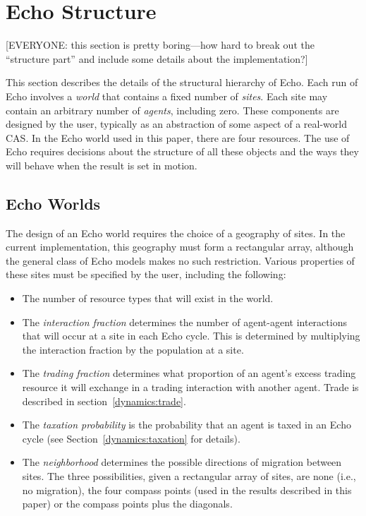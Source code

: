 \section{Echo Structure}
\label{echo-structure}

[EVERYONE: this section is pretty boring---how hard to break out the
``structure part'' and include some details about the implementation?]

This section describes the details of the structural hierarchy of
Echo.  Each run of Echo involves a {\em world\/} that contains a fixed
number of {\em sites}.  Each site may contain an arbitrary number of
{\em agents}, including zero.  These components are designed by the
user, typically as an abstraction of some aspect of a real-world
CAS\@.  In the Echo world used in this paper, there are four
resources.  The use of Echo requires decisions about the structure of
all these objects and the ways they will behave when the result is set
in motion.

\subsection{Echo Worlds}
The design of an Echo world requires the choice of a geography of
sites. In the current implementation, this geography must form a
rectangular array, although the general class of Echo models makes no
such restriction. Various properties of these sites must be
specified by the user, including the following:

\begin{itemize}
\item The number of resource types that will exist in the world.

\item The {\em interaction fraction\/} determines the number of
  agent-agent interactions that will occur at a site in each Echo
  cycle. This is determined by multiplying the interaction fraction by the
  population at a site. 

\item The {\em trading fraction\/} determines what proportion of an
  agent's excess trading resource it will exchange in a trading
  interaction with another agent. Trade is described in
  section~\ref{dynamics:trade}. 

\item The {\em taxation probability\/} is the probability that an
  agent is taxed in an Echo cycle (see Section~\ref{dynamics:taxation}
  for details). 

\item The {\em neighborhood\/} determines the possible directions of
  migration between sites. The three possibilities, given a
  rectangular array of sites, are none (i.e., no migration), the four
  compass points (used in the results described in this paper) or the
  compass points plus the diagonals.
\end{itemize}

